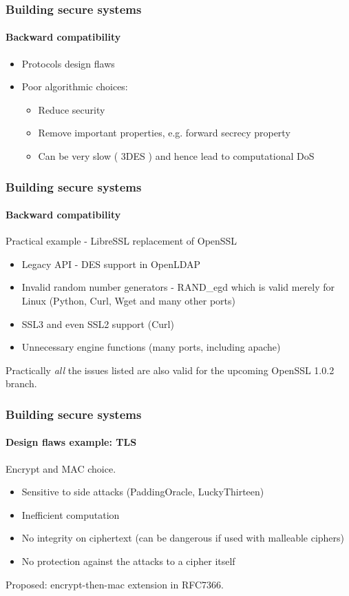 \documentclass[11pt,t]{beamer}
\newcommand{\funcname}[1]{
	{\color{yellow!30} #1}
}
\newcommand{\cipher}[1]{
	{\color{blue!30} #1}
}
\begin{document}
\begin{frame}
\frametitle{Building secure systems}
\framesubtitle{Backward compatibility}
\begin{itemize}
\item<1-> Protocols design flaws
\item<2-> Poor algorithmic choices:
	\begin{itemize}
	\item Reduce security
	\item Remove important properties, e.g. forward secrecy property
	\item Can be very slow (\cipher{3DES}) and hence lead to computational DoS
	\end{itemize}
\end{itemize}
\end{frame}

\begin{frame}
\frametitle{Building secure systems}
\framesubtitle{Backward compatibility}
Practical example - LibreSSL replacement of OpenSSL
\begin{itemize}
\item Legacy API - \cipher{DES} support in OpenLDAP
\item Invalid random number generators - \funcname{RAND\_egd} which is valid merely for Linux (Python, Curl, Wget and many other ports)
\item SSL3 and even SSL2 support (Curl)
\item Unnecessary engine functions (many ports, including apache) 
\end{itemize}

Practically \textit{all} the issues listed are also valid for the upcoming OpenSSL 1.0.2 
branch.
\end{frame}

\begin{frame}
\frametitle{Building secure systems}
\framesubtitle{Design flaws example: TLS}
Encrypt and MAC choice.
\begin{itemize}
\item Sensitive to side attacks (PaddingOracle, LuckyThirteen)
\item Inefficient computation
\item No integrity on ciphertext (can be dangerous if used with malleable ciphers)
\item No protection against the attacks to a cipher itself
\end{itemize}
Proposed: encrypt-then-mac extension in RFC7366.
\end{frame}
\end{document}
